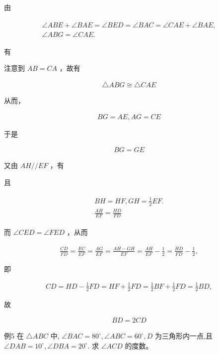 \documentclass[10pt]{article}
\begin{document}
由

\begin{align*}
\begin{gathered}
\angle A B E+\angle B A E=\angle B E D=\angle B A C=\angle C A E+\angle B A E, \\
\angle A B G=\angle C A E .
\end{gathered}
\end{align*}

有

注意到 $A B=C A$ ，故有

\begin{align*}
\triangle A B G \cong \triangle C A E
\end{align*}

从而，

\begin{align*}
B G=A E, A G=C E
\end{align*}

于是

\begin{align*}
B G=G E
\end{align*}

又由 $A H / / E F$ ，有

且

\begin{align*}
\begin{gathered}
B H=H F, G H=\frac{1}{2} E F . \\
\frac{A H}{E F}=\frac{H D}{F D}
\end{gathered}
\end{align*}

而 $\angle C E D=\angle F E D$ ，从而

\begin{align*}
\frac{C D}{F D}=\frac{E \dot{C}}{E F}=\frac{A G}{E F}=\frac{A H-G H}{E F}=\frac{A H}{E F}-\frac{1}{2}=\frac{H D}{F D}-\frac{1}{2},
\end{align*}

即

\begin{align*}
C D=H D-\frac{1}{2} F D=H F+\frac{1}{2} F D=\frac{1}{2} B F+\frac{1}{2} F D=\frac{1}{2} B D,
\end{align*}

故

\begin{align*}
B D=2 C D
\end{align*}

例5 在 $\triangle A B C$ 中, $\angle B A C=80^{\circ}, \angle A B C=60^{\circ}, D$ 为三角形内一点,且 $\angle D A B=10^{\circ}, \angle D B A=20^{\circ}$. 求 $\angle A C D$ 的度数。
\end{document}
